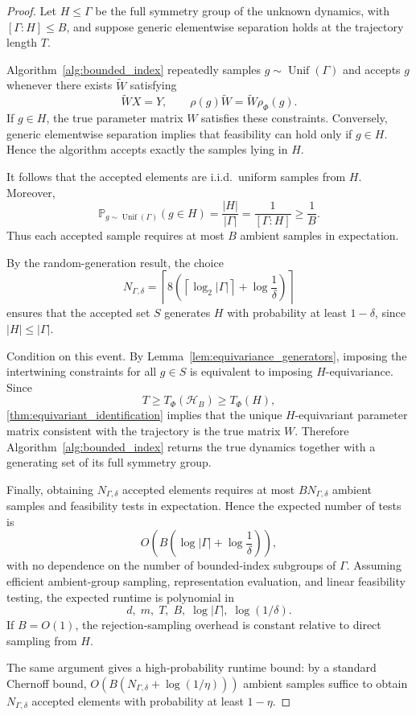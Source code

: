 \documentclass[11pt]{article}
\theoremstyle{plain}
\theoremstyle{definition}
\theoremstyle{remark}
\begin{document}
\begin{proof}
Let \(H\le\Gamma\) be the full symmetry group of the unknown dynamics, with
\([\Gamma:H]\le B\), and suppose generic elementwise separation holds at the
trajectory length \(T\).

Algorithm~\ref{alg:bounded_index} repeatedly samples
\(g\sim\operatorname{Unif}(\Gamma)\) and accepts \(g\) whenever there exists
\(\widetilde W\) satisfying
\[
\widetilde W X=Y,
\qquad
\rho(g)\widetilde W=\widetilde W\rho_\Phi(g).
\]
If \(g\in H\), the true parameter matrix \(W\) satisfies these constraints.
Conversely, generic elementwise separation implies that feasibility can hold
only if \(g\in H\). Hence the algorithm accepts exactly the samples lying in
\(H\).

It follows that the accepted elements are i.i.d.\ uniform samples from \(H\).
Moreover,
\[
\mathbb P_{g\sim\operatorname{Unif}(\Gamma)}(g\in H)
=
\frac{|H|}{|\Gamma|}
=
\frac{1}{[\Gamma:H]}
\ge\frac1B.
\]
Thus each accepted sample requires at most \(B\) ambient samples in
expectation.

By the random-generation result, the choice
\[
N_{\Gamma,\delta}
=
\left\lceil
8\left(
\left\lceil\log_2|\Gamma|\right\rceil
+\log\frac1\delta
\right)
\right\rceil
\]
ensures that the accepted set \(S\) generates \(H\) with probability at least
\(1-\delta\), since \(|H|\le|\Gamma|\).

Condition on this event. By Lemma~\ref{lem:equivariance_generators}, imposing the
intertwining constraints for all \(g\in S\) is equivalent to imposing
\(H\)-equivariance. Since
\[
T\ge T_\Phi(\mathcal H_B)\ge T_\Phi(H),
\]
\cref{thm:equivariant_identification} implies that the unique
\(H\)-equivariant parameter matrix consistent with the trajectory is the true
matrix \(W\). Therefore Algorithm~\ref{alg:bounded_index} returns the true
dynamics together with a generating set of its full symmetry group.

Finally, obtaining \(N_{\Gamma,\delta}\) accepted elements requires at most
\(BN_{\Gamma,\delta}\) ambient samples and feasibility tests in expectation.
Hence the expected number of tests is
\[
O\left(
B\left(\log|\Gamma|+\log\frac1\delta\right)
\right),
\]
with no dependence on the number of bounded-index subgroups of \(\Gamma\).
Assuming efficient ambient-group sampling, representation evaluation, and
linear feasibility testing, the expected runtime is polynomial in
\[
d,\;m,\;T,\;B,\;\log|\Gamma|,\;\log(1/\delta).
\]
If \(B=O(1)\), the rejection-sampling overhead is constant relative to direct
sampling from \(H\).

The same argument gives a high-probability runtime bound: by a standard
Chernoff bound, \(O(B(N_{\Gamma,\delta}+\log(1/\eta)))\) ambient samples
suffice to obtain \(N_{\Gamma,\delta}\) accepted elements with probability at
least \(1-\eta\).
\end{proof}
\end{document}
